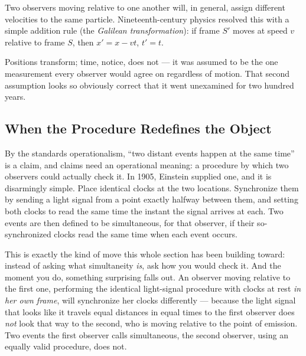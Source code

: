 Two observers moving relative to one another will, in general, assign different
velocities to the same particle. Nineteenth-century physics resolved this with
a simple addition rule (the \emph{Galilean transformation}): if frame $S'$
moves at speed $v$ relative to frame $S$, then $x' = x - vt$, $t' = t$.

Positions transform; time, notice, does not --- it was assumed to be the one
measurement every observer would agree on regardless of motion. That second
assumption looks so obviously correct that it went unexamined for two hundred
years. 

\subsection{When the Procedure Redefines the Object}

By the standards operationalism, ``two distant events
happen at the same time'' is a claim, and claims need an operational meaning: a
procedure by which two observers could actually check it. In 1905, Einstein
supplied one, and it is disarmingly simple. Place identical clocks at the two
locations. Synchronize them by sending a light signal from a point exactly
halfway between them, and setting both clocks to read the same time the instant
the signal arrives at each. Two events are then defined to be simultaneous, for
that observer, if their so-synchronized clocks read the same time when each
event occurs.

This is exactly the kind of move this whole section has been building toward:
instead of asking what simultaneity \emph{is}, ask how you would check it. And
the moment you do, something surprising falls out. An observer moving relative
to the first one, performing the identical light-signal procedure with clocks
at rest \emph{in her own frame}, will synchronize her clocks differently ---
because the light signal that looks like it travels equal distances in equal
times to the first observer does \emph{not} look that way to the second, who is
moving relative to the point of emission. Two events the first observer calls
simultaneous, the second observer, using an equally valid procedure, does not.

